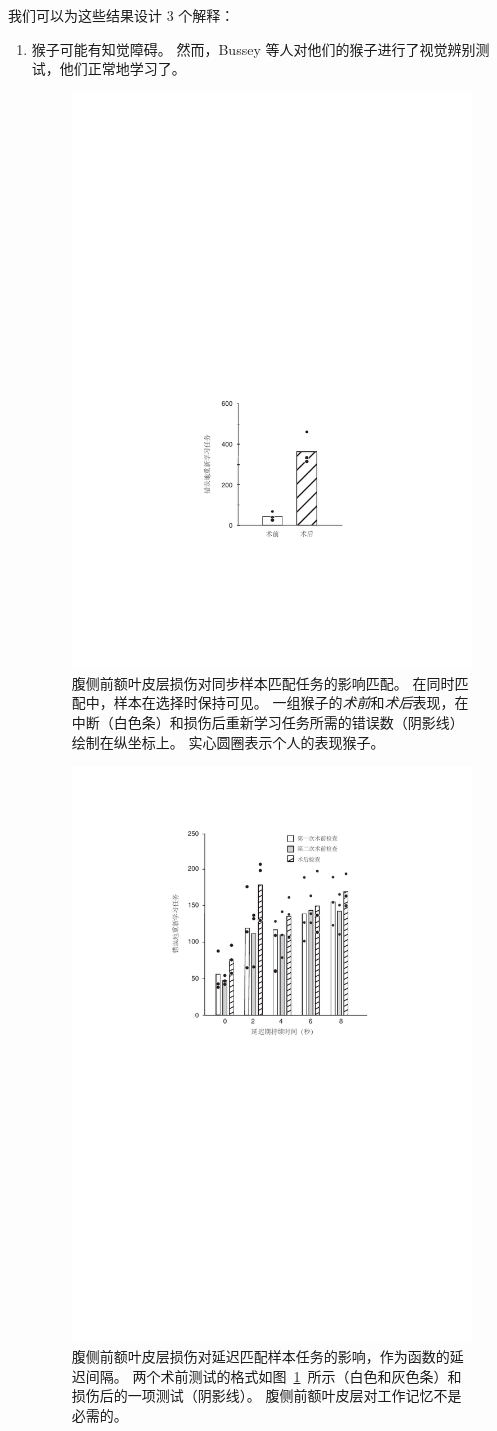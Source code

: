 我们可以为这些结果设计 3 个解释：
\begin{enumerate}
\item 猴子可能有知觉障碍。 
然而，Bussey 等人\cite{bussey2001role}对他们的猴子进行了视觉辨别测试，他们正常地学习了。


\begin{figure}
	\centering
	\includegraphics[width=0.45\linewidth]{chap7/7_3}
	\caption{腹侧前额叶皮层损伤对同步样本匹配任务的影响匹配。
		在同时匹配中，样本在选择时保持可见。
		一组猴子的\textit{术前}和\textit{术后}表现，在中断（白色条）和损伤后重新学习任务所需的错误数（阴影线）绘制在纵坐标上。
		实心圆圈表示个人的表现猴子\cite{rushworth1997ventral}。\label{fig:7_3}}
\end{figure}


\begin{figure}
	\centering
	\includegraphics[width=0.64\linewidth]{chap7/7_4}
	\caption{腹侧前额叶皮层损伤对延迟匹配样本任务的影响，作为函数的延迟间隔。 
		两个术前测试的格式如图~\ref{fig:7_3}~所示（白色和灰色条）和损伤后的一项测试（阴影线）。
		腹侧前额叶皮层对工作记忆不是必需的\cite{rushworth1997ventral}。\label{fig:7_4}}
\end{figure}



\end{enumerate}
